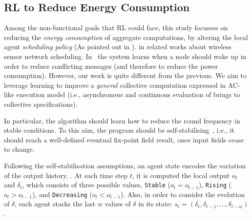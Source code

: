 \subsection{\Acl{RL} to Reduce Energy Consumption}\label{acsos2022:acrl-energy-goal}
Among the non-functional goals that \ac{RL} could face, 
 this study %
 focusses on reducing the \emph{energy consumption} of aggregate computations,
 by altering the local agent \emph{scheduling policy} (As pointed out in ).
%
%
 in related works about wireless sensor network scheduling.
In~\cite{DBLP:journals/automatica/IwakiWWSJ21,DBLP:journals/ijcnds/MihaylovBTN12} the system learns 
when a node should wake up in order to reduce conflicting messages 
(and therefore to reduce the power consumption). 
However, our work is quite different from the previous. 
We aim to leverage learning to improve a \emph{general} collective computation 
expressed in \ac{AC}-like execution model (i.e., asynchronous and continuous evaluation of  brings to collective specifications).

In particular, the algorithm should learn how to reduce the round frequency in stable conditions. 
 To this aim, the program should be self-stabilising~\cite{DBLP:journals/tomacs/ViroliABDP18}, 
 i.e., it should reach a well-defined eventual fix-point field result, once input fields cease to change.

 Following the self-stabilisation assumptions, an agent state encodes the variation of the output history, .
 At each time step $t$, it is computed the local output $o_t$ and $\delta_t$, which consists of three possible values, \texttt{Stable} ($o_t = o_{t-1}$), \texttt{Rising} ($o_t > o_{t-1}$), and \texttt{Decreasing} ($o_ t < o_{t-1}$).
Also, in order to consider the evolution of $\delta$, each agent stacks the last $w$ values of $\delta$ in its state: $s_t =(\delta_t, \delta_{t-1}, \dots, \delta_{t-w})$.

